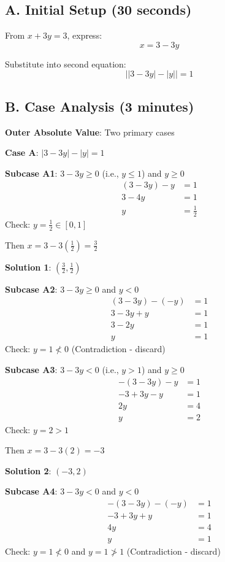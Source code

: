 \documentclass[]{article}
\begin{document}
\begin{solutionbox}
\subsection*{A. Initial Setup (30 seconds)}
From $x + 3y = 3$, express:
\[x = 3 - 3y\]

Substitute into second equation:
\[\left| |3-3y| - |y| \right| = 1\]

\subsection*{B. Case Analysis (3 minutes)}

\textbf{Outer Absolute Value}: Two primary cases

\textbf{Case A}: $|3-3y| - |y| = 1$

\quad \textbf{Subcase A1}: $3-3y \geq 0$ (i.e., $y \leq 1$) and $y \geq 0$
\begin{align*}
(3-3y) - y &= 1\\
3 - 4y &= 1\\
y &= \frac{1}{2}
\end{align*}
Check: $y = \frac{1}{2} \in [0,1]$ \checkmark

Then $x = 3 - 3(\frac{1}{2}) = \frac{3}{2}$

\textbf{Solution 1}: $\left(\frac{3}{2}, \frac{1}{2}\right)$

\quad \textbf{Subcase A2}: $3-3y \geq 0$ and $y < 0$
\begin{align*}
(3-3y) - (-y) &= 1\\
3 - 3y + y &= 1\\
3 - 2y &= 1\\
y &= 1
\end{align*}
Check: $y = 1 \not< 0$ \texttimes \quad (Contradiction - discard)

\quad \textbf{Subcase A3}: $3-3y < 0$ (i.e., $y > 1$) and $y \geq 0$
\begin{align*}
-(3-3y) - y &= 1\\
-3 + 3y - y &= 1\\
2y &= 4\\
y &= 2
\end{align*}
Check: $y = 2 > 1$ \checkmark

Then $x = 3 - 3(2) = -3$

\textbf{Solution 2}: $(-3, 2)$

\quad \textbf{Subcase A4}: $3-3y < 0$ and $y < 0$
\begin{align*}
-(3-3y) - (-y) &= 1\\
-3 + 3y + y &= 1\\
4y &= 4\\
y &= 1
\end{align*}
Check: $y = 1 \not< 0$ and $y = 1 \not> 1$ \texttimes \quad (Contradiction - discard)


\end{solutionbox}
\end{document}
